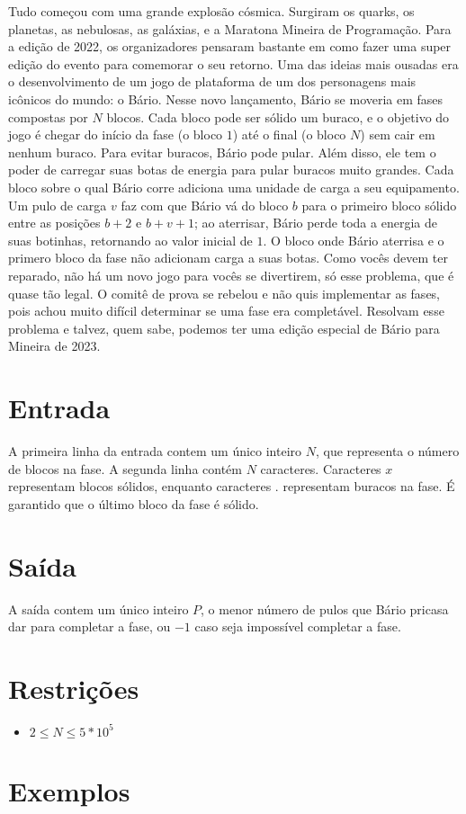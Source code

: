 Tudo começou com uma grande explosão cósmica. Surgiram os quarks, os planetas, as nebulosas, as galáxias, e a Maratona Mineira de Programação.
Para a edição de 2022, os organizadores pensaram bastante em como fazer uma super edição do evento para comemorar o seu retorno. Uma das ideias mais
ousadas era o desenvolvimento de um jogo de plataforma de um dos personagens mais icônicos do mundo: o Bário.
Nesse novo lançamento, Bário se moveria em fases compostas por $N$ blocos.
Cada bloco pode ser sólido um buraco, e o objetivo do jogo é chegar do início da fase (o bloco $1$) até o final (o bloco $N$) sem cair em nenhum buraco.
Para evitar buracos, Bário pode pular.
Além disso, ele tem o poder de carregar suas botas de energia para pular buracos muito grandes.
Cada bloco sobre o qual Bário corre adiciona uma unidade de carga a seu equipamento.
Um pulo de carga $v$ faz com que Bário vá do bloco $b$ para o primeiro bloco sólido entre as posições $b+2$ e $b+v+1$;
ao aterrisar, Bário perde toda a energia de suas botinhas, retornando ao valor inicial de $1$.
O bloco onde Bário aterrisa e o primero bloco da fase não adicionam carga a suas botas.
Como vocês devem ter reparado, não há um novo jogo para vocês se divertirem, só esse problema, que é quase tão legal.
O comitê de prova se rebelou e não quis implementar as fases, pois achou muito difícil determinar se uma fase era completável.
Resolvam esse problema e talvez, quem sabe, podemos ter uma edição especial de Bário para Mineira de 2023.



\section*{Entrada}

A primeira linha da entrada contem um único inteiro $N$, que representa o número de blocos na fase.
A segunda linha contém $N$ caracteres. Caracteres $x$ representam blocos sólidos, enquanto caracteres $.$ representam buracos na fase. É garantido que o último bloco da fase é sólido.

\section*{Saída}

A saída contem um único inteiro $P$, o menor número de pulos que Bário pricasa dar para completar a fase, ou $-1$ caso seja impossível completar a fase.

\section*{Restrições}

\begin{itemize}
\item $2 \leq N \leq 5 * 10^5$
\end{itemize}


\section*{Exemplos}

\exemplo
